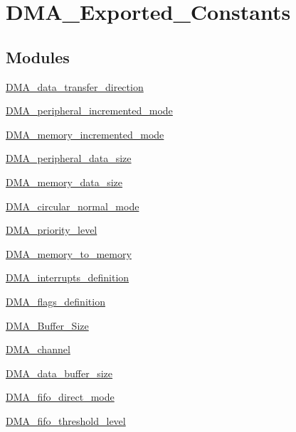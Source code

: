 \hypertarget{group___d_m_a___exported___constants}{\section{D\-M\-A\-\_\-\-Exported\-\_\-\-Constants}
\label{group___d_m_a___exported___constants}
}
\subsection*{Modules}
\begin{DoxyCompactItemize}
\item 
\hyperlink{group___d_m_a__data__transfer__direction}{D\-M\-A\-\_\-data\-\_\-transfer\-\_\-direction}
\item 
\hyperlink{group___d_m_a__peripheral__incremented__mode}{D\-M\-A\-\_\-peripheral\-\_\-incremented\-\_\-mode}
\item 
\hyperlink{group___d_m_a__memory__incremented__mode}{D\-M\-A\-\_\-memory\-\_\-incremented\-\_\-mode}
\item 
\hyperlink{group___d_m_a__peripheral__data__size}{D\-M\-A\-\_\-peripheral\-\_\-data\-\_\-size}
\item 
\hyperlink{group___d_m_a__memory__data__size}{D\-M\-A\-\_\-memory\-\_\-data\-\_\-size}
\item 
\hyperlink{group___d_m_a__circular__normal__mode}{D\-M\-A\-\_\-circular\-\_\-normal\-\_\-mode}
\item 
\hyperlink{group___d_m_a__priority__level}{D\-M\-A\-\_\-priority\-\_\-level}
\item 
\hyperlink{group___d_m_a__memory__to__memory}{D\-M\-A\-\_\-memory\-\_\-to\-\_\-memory}
\item 
\hyperlink{group___d_m_a__interrupts__definition}{D\-M\-A\-\_\-interrupts\-\_\-definition}
\item 
\hyperlink{group___d_m_a__flags__definition}{D\-M\-A\-\_\-flags\-\_\-definition}
\item 
\hyperlink{group___d_m_a___buffer___size}{D\-M\-A\-\_\-\-Buffer\-\_\-\-Size}
\item 
\hyperlink{group___d_m_a__channel}{D\-M\-A\-\_\-channel}
\item 
\hyperlink{group___d_m_a__data__buffer__size}{D\-M\-A\-\_\-data\-\_\-buffer\-\_\-size}
\item 
\hyperlink{group___d_m_a__fifo__direct__mode}{D\-M\-A\-\_\-fifo\-\_\-direct\-\_\-mode}
\item 
\hyperlink{group___d_m_a__fifo__threshold__level}{D\-M\-A\-\_\-fifo\-\_\-threshold\-\_\-level}

\end{DoxyCompactItemize}
